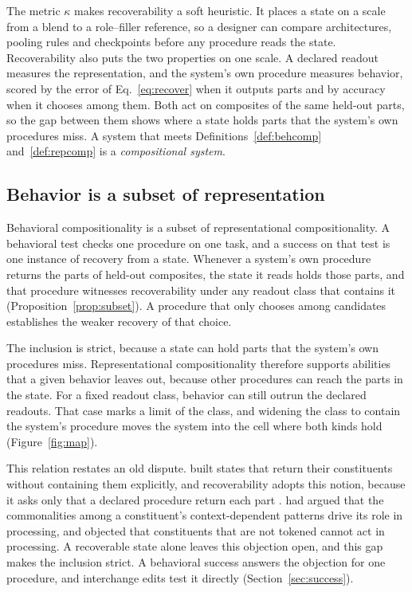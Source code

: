 \documentclass[10pt]{article}
\theoremstyle{plain}
\theoremstyle{remark}
\begin{document}
The metric $\kappa$ makes recoverability a soft heuristic. It places a state on a scale from a blend to a role--filler reference, so a designer can compare architectures, pooling rules and checkpoints before any procedure reads the state. Recoverability also puts the two properties on one scale. A declared readout measures the representation, and the system's own procedure measures behavior, scored by the error of Eq.~\ref{eq:recover} when it outputs parts and by accuracy when it chooses among them. Both act on composites of the same held-out parts, so the gap between them shows where a state holds parts that the system's own procedures miss. A system that meets Definitions~\ref{def:behcomp} and~\ref{def:repcomp} is a \emph{compositional system}.

\subsection{Behavior is a subset of representation}
\label{sec:subset}

Behavioral compositionality is a subset of representational compositionality. A behavioral test checks one procedure on one task, and a success on that test is one instance of recovery from a state. Whenever a system's own procedure returns the parts of held-out composites, the state it reads holds those parts, and that procedure witnesses recoverability under any readout class that contains it (Proposition~\ref{prop:subset}). A procedure that only chooses among candidates establishes the weaker recovery of that choice.

The inclusion is strict, because a state can hold parts that the system's own procedures miss. Representational compositionality therefore supports abilities that a given behavior leaves out, because other procedures can reach the parts in the state. For a fixed readout class, behavior can still outrun the declared readouts. That case marks a limit of the class, and widening the class to contain the system's procedure moves the system into the cell where both kinds hold (Figure~\ref{fig:map}).

This relation restates an old dispute. \citet{smolensky1990} built states that return their constituents without containing them explicitly, and recoverability adopts this notion, because it asks only that a declared procedure return each part \citep[cf.][]{vangelder1990}. \citet{smolensky1988} had argued that the commonalities among a constituent's context-dependent patterns drive its role in processing, and \citet{fodor1990} objected that constituents that are not tokened cannot act in processing. A recoverable state alone leaves this objection open, and this gap makes the inclusion strict. A behavioral success answers the objection for one procedure, and interchange edits test it directly (Section~\ref{sec:success}).
\end{document}
